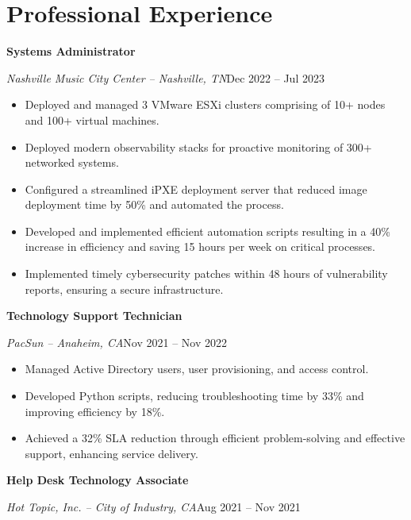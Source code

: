 \documentclass[a4paper]{article}
\begin{document}
\begin{minipage}[t]{0.62\textwidth}
    \raggedright
    \vspace*{0pt}

    \section{Professional Experience}
    \textbf{Systems Administrator}\par
    \textit{Nashville Music City Center -- Nashville, TN}\hfill Dec 2022 -- Jul 2023

    \begin{itemize}[noitemsep,nolistsep]
        \item Deployed and managed 3 VMware ESXi clusters comprising of 10+ nodes and 100+ virtual machines.
        \item Deployed modern observability stacks for proactive monitoring of 300+ networked systems.
        \item Configured a streamlined iPXE deployment server that reduced image deployment time by 50\% and automated the process.
        \item Developed and implemented efficient automation scripts resulting in a 40\% increase in efficiency and saving 15 hours per week on critical processes.
        \item Implemented timely cybersecurity patches within 48 hours of vulnerability reports, ensuring a secure infrastructure.
    \end{itemize}

    \vspace{0.5em}
    \textbf{Technology Support Technician}\par
    \textit{PacSun -- Anaheim, CA}\hfill Nov 2021 -- Nov 2022

    \begin{itemize}[noitemsep,nolistsep]
        \item Managed Active Directory users, user provisioning, and access control.
        \item Developed Python scripts, reducing troubleshooting time by 33\% and improving efficiency by 18\%.
        \item Achieved a 32\% SLA reduction through efficient problem-solving and effective support, enhancing service delivery.
    \end{itemize}

    \vspace{0.5em}
    \textbf{Help Desk Technology Associate}\par
    \textit{Hot Topic, Inc. -- City of Industry, CA}\hfill Aug 2021 -- Nov 2021


\end{minipage}
\end{document}
